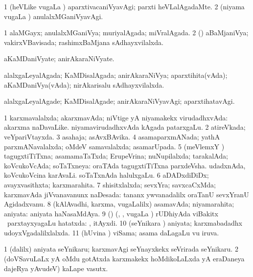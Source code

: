 \bentry
{}
\gl{\kirxvi}
\bmng
\bnum
\num{1} (heVLike \mo vugaLa \vi) aparxtivacaniVyavAgi; parxti heVLalAgadaMte. 
\num{2} (niyama \mo vugaLa \vi) anulalxMGaniVyavAgi. 
\enum
\emng
\eentry

\bentry
{}
\gl{\gu}
\bmng
\bnum
\num{1} alaMGayx; anulalxMGaniVya; muriyalAgada; miVralAgada. 
\num{2} (\daqvi) aBaMjaniVya; vakirxVBavisada; rashimxBaMjana sAdhayxvilalxda. 
\enum
\emng
\eentry

\bentry
{}
\gl{\nA}
\bmng
aKaMDaniVyate; anirAkaraNiVyate. 
\emng
\eentry

\bentry
{}
\gl{\gu}
\bmng
alalxgaLeyalAgada; KaMDisalAgada; anirAkaraNiVya; aparxtihita(vAda); aKaMDaniVya(vAda); nirAkarisalu sAdhayxvilalxda. 
\emng
\eentry

\bentry
{}
\gl{\kirxvi}
\bmng
alalxgaLeyalAgade; KaMDisalAgade; anirAkaraNiVyavAgi; aparxtihatavAgi. 
\emng
\eentry

\bentry
{}
\gl{\gu}
\bmng
\bnum
\num{1} karxmavalalxda; akarxmavAda; niVtige yA niyamakekx virudadhxvAda:  akarxma naDavaLike.  niyamavirudadhxvAda kAgada patarxgaLu. 
\num{2} atireVkada; veYpariVtayxda. 
\num{3} asahaja; asAvxBAvika. 
\num{4} asamaparxmANada; yathA parxmANavalalxda; oMdeV samavalalxda; asamarUpada. 
\num{5} (meVlemxY \vi) tagugxtiTiTxna; asamamaTaTxda; ErupeVrina; nuNupilalxda; tarakalAda; koVcukoVcAda; soTaTxneya:  oraTAda tagugxtiTiTxna parxdeVsha.  udadxnAda, koVcukoVcina karAvaLi.  soTaTxnAda halulxgaLu. 
\num{6} aDADxdiDiDx; avayxvasithxta; karxmarahita. 
\num{7} shisitxlalxda; sevxYra; savxcaCxMda; karxmavAda jiVvanavanunx naDesada:  tananx ywvanadalilx oraTanU sevxYranU Agidadxvanu. 
\num{8} (kAlAvadhi, karxma, \mo vugaLalilx) asamavAda; niyamarahita; aniyata:  aniyata haNasaMdAya. 
\num{9} (\vAyx) (\kirx, \nA, \mo vugaLa \vi) rUDhiyAda viBakitx \mo\ parxtayxyagaLu hatatxda: , itAyxdi. 
\num{10} (seYnikara \vi) aniyata; karxmabadadhx udoyxVgadalilxlalxda. 
\num{11} (hUvina \vi) viSama; asama daLagaLu \mo vu iruva. 
\enum
\emng
\eentry

\bentry
{}
\gl{\nA}
\bmng
\bnum
\num{1} (\bava dalilx) aniyata seYnikaru; karxmavAgi seYnayxkekx seVrirada seYnikaru. 
\num{2} (doVSavuLaLx yA oMdu gotAtxda karxmakekx hoMdikoLaLxda yA eraDaneya dajeRya yAvudeV) kaLape vasutx. 
\enum
\emng
\eentry

